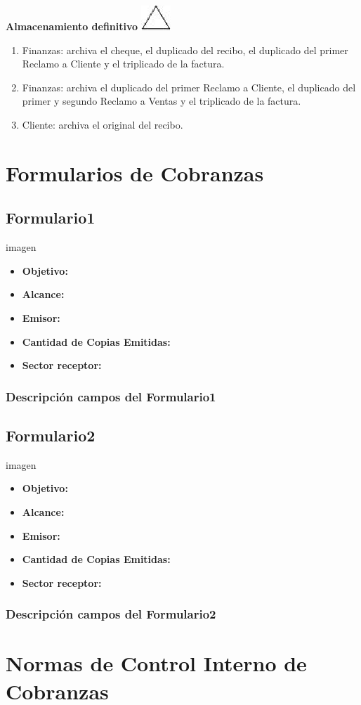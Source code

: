 \begin{center}
  \textbf{Almacenamiento definitivo}
  \includegraphics{../../../Images/Simbolos/simbolo-Almacenamiento-Definitivo.png}
\end{center}
\begin{enumerate}
\item Finanzas: archiva el cheque, el duplicado del recibo, el duplicado del primer Reclamo a Cliente y el triplicado de la factura.
\item Finanzas: archiva el duplicado del primer Reclamo a Cliente, el duplicado del primer y segundo Reclamo a Ventas y el triplicado de la factura.
\item Cliente: archiva el original del recibo.
\end{enumerate}

\pagebreak
\section{Formularios de Cobranzas}
\subsection{Formulario1}
imagen
\begin{itemize}
  \item \textbf{Objetivo:}
  \item \textbf{Alcance:}
  \item \textbf{Emisor:}
  \item \textbf{Cantidad de Copias Emitidas:}
  \item \textbf{Sector receptor:}
 \end{itemize}
\subsubsection{Descripci\'on campos del Formulario1}

\subsection{Formulario2}
imagen
\begin{itemize}
  \item \textbf{Objetivo:}
  \item \textbf{Alcance:}
  \item \textbf{Emisor:}
  \item \textbf{Cantidad de Copias Emitidas:}
  \item \textbf{Sector receptor:}
 \end{itemize}
\subsubsection{Descripci\'on campos del Formulario2}

\pagebreak
\section{Normas de Control Interno de Cobranzas}
